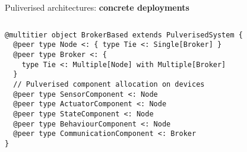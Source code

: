 \begin{frame}[fragile]{Puliverised architectures: \textbf{concrete deployments}}
  \begin{columns}
    \begin{column}{0.58\textwidth}
      \begin{cardTiny}
        \begin{verbatim}
@multitier object BrokerBased extends PulverisedSystem {
  @peer type Node <: { type Tie <: Single[Broker] }
  @peer type Broker <: { 
    type Tie <: Multiple[Node] with Multiple[Broker] 
  }
  // Pulverised component allocation on devices
  @peer type SensorComponent <: Node
  @peer type ActuatorComponent <: Node
  @peer type StateComponent <: Node
  @peer type BehaviourComponent <: Node
  @peer type CommunicationComponent <: Broker
}
        \end{verbatim}
      \end{cardTiny}
    \end{column}
    \begin{column}{0.43\textwidth}
    \end{column}
  \end{columns}
\end{frame}